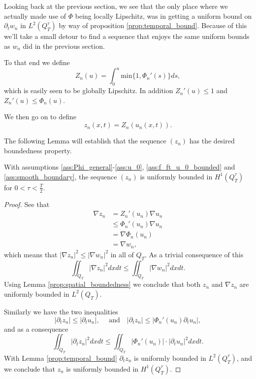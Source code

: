 \documentclass[11pt, a4paper]{article}
\begin{document}
Looking back at the previous section, we see that the only place where we actually made use of $\Phi$ being locally Lipschitz, was in getting a uniform bound on $\partial_t w_n$ in $L^2(Q_T^\tau)$ by way of proposition \ref{prop:temporal_bound}. Because of this we'll take a small detour to find a sequence that enjoys the same uniform bounds as $w_n$ did in the previous section.

To that end we define
\begin{equation}
Z_n(u) = \int_0^u \mathrm{min}\{1, \Phi_n'(s)\} ds,
\end{equation}
which is easily seen to be globally Lipschitz. In addition $Z_n'(u) \leq 1$ and $Z_n'(u) \leq \Phi_n(u)$.

We then go on to define
\begin{equation}
z_n(x,t) = Z_n(u_n(x,t)).
\end{equation}

The following Lemma will establish that the sequence $(z_n)$ has the desired boundedness property.

\begin{proposition}
\label{prop:z_n_bounded_H1}
With assumptions \ref{ass:Phi_general}-\ref{ass:u_0}, \ref{ass:f_ft_u_0_bounded} and \ref{ass:smooth_boundary}, the sequence $(z_n)$ is uniformly bounded in $H^1(Q_T^\tau)$ for $0<\tau < \frac{T}{2}$.
\end{proposition} 

\begin{proof}
See that
\begin{align*}
\nabla z_n &= Z_n'(u_n)\nabla u_n \\
	&\leq \Phi_n'(u_n)\nabla u_n \\
	&= \nabla \Phi_n(u_n) \\
	&= \nabla w_n,
\end{align*}
which means that $|\nabla z_n|^2 \leq |\nabla w_n|^2$ in all of $Q_T$. As a trivial consequence of this
\begin{equation*}
\iint_{Q_T}|\nabla z_n|^2dxdt \leq \iint_{Q_T}|\nabla w_n|^2dxdt.
\end{equation*}
Using Lemma \ref{prop:spatial_boundedness} we conclude that both $z_n$ and $\nabla z_n$ are uniformly bounded in $L^2(Q_T)$.

Similarly we have the two inequalities
\begin{equation*}
|\partial_t z_n | \leq |\partial_t u_n|, \quad \text{ and} \quad |\partial_t z_n| \leq |\Phi_n'(u_n) \partial_t u_n|,
\end{equation*}
and as a consequence
\begin{equation*}
\iint_{Q_T}|\partial_t z_n|^2 dxdt \leq \iint_{Q_T} |\Phi_n'(u_n)|\cdot |\partial_t u_n|^2dxdt.
\end{equation*}
With Lemma \ref{prop:temporal_bound} $\partial_t z_n$ is uniformly bounded in $L^2(Q_T^\tau)$, and we conclude that $z_n$ is uniformly bounded in $H^1(Q_T^\tau)$.
\end{proof}
\end{document}
